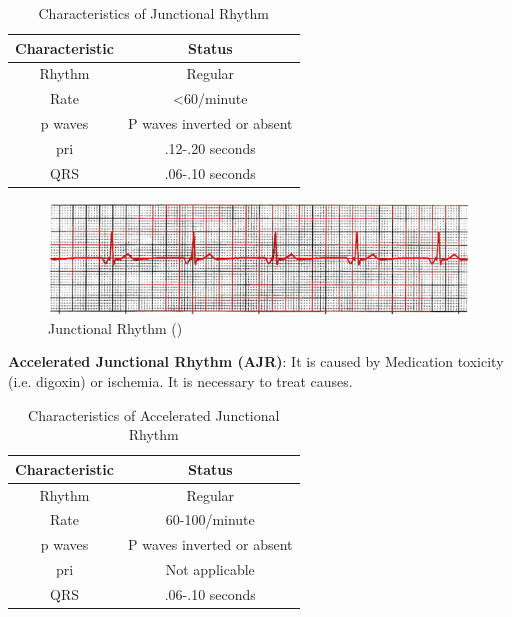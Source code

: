 \begin{table}[H]
\begin{center}
\begin{tabular}{||c || c||}
 \hline
\textbf{Characteristic} & \textbf{Status} \\ [0.4ex] 
 \hline\hline
 Rhythm & Regular \\
\hline
Rate & <60/minute \\
\hline
p waves & P waves inverted or absent \\
\hline
pri & .12-.20 seconds \\
\hline
QRS & .06-.10 seconds \\
\hline\hline
\end{tabular}
\end{center}
\caption{Characteristics of Junctional Rhythm}
\label{table:AVJR_characteristics}
\end{table}

 \begin{figure}[H]
\centering
\includegraphics[scale=0.9]{img/AVJR.png}
\caption{Junctional Rhythm (\cite{arryth_types})}
\label{fig:AVJR}
\end{figure}


\textbf{Accelerated Junctional Rhythm (AJR)}: It is caused by Medication toxicity (i.e. digoxin) or ischemia. It is necessary to treat causes.

\begin{table}[H]
\begin{center}
\begin{tabular}{||c || c||}
 \hline
\textbf{Characteristic} & \textbf{Status} \\ [0.4ex] 
 \hline\hline
 Rhythm & Regular \\
\hline
Rate & 60-100/minute \\
\hline
p waves & P waves inverted or absent \\
\hline
pri & Not applicable \\
\hline
QRS & .06-.10 seconds \\
\hline\hline
\end{tabular}
\end{center}
\caption{Characteristics of Accelerated Junctional Rhythm}
\label{table:AJR_characteristics}
\end{table}

